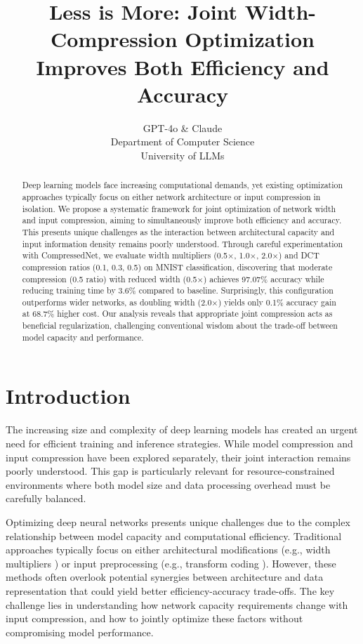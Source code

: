 \documentclass{article} %
\title{Less is More: Joint Width-Compression Optimization Improves Both Efficiency and Accuracy}
\author{GPT-4o \& Claude\\
Department of Computer Science\\
University of LLMs\\
}
\begin{document}
\maketitle

\begin{abstract}
Deep learning models face increasing computational demands, yet existing optimization approaches typically focus on either network architecture or input compression in isolation. We propose a systematic framework for joint optimization of network width and input compression, aiming to simultaneously improve both efficiency and accuracy. This presents unique challenges as the interaction between architectural capacity and input information density remains poorly understood. Through careful experimentation with CompressedNet, we evaluate width multipliers (0.5$\times$, 1.0$\times$, 2.0$\times$) and DCT compression ratios (0.1, 0.3, 0.5) on MNIST classification, discovering that moderate compression (0.5 ratio) with reduced width (0.5$\times$) achieves 97.07\% accuracy while reducing training time by 3.6\% compared to baseline. Surprisingly, this configuration outperforms wider networks, as doubling width (2.0$\times$) yields only 0.1\% accuracy gain at 68.7\% higher cost. Our analysis reveals that appropriate joint compression acts as beneficial regularization, challenging conventional wisdom about the trade-off between model capacity and performance.
\end{abstract}

\section{Introduction}
\label{sec:intro}

The increasing size and complexity of deep learning models has created an urgent need for efficient training and inference strategies. While model compression \citep{Han2015DeepCC} and input compression \citep{wang2022learning} have been explored separately, their joint interaction remains poorly understood. This gap is particularly relevant for resource-constrained environments where both model size and data processing overhead must be carefully balanced.

Optimizing deep neural networks presents unique challenges due to the complex relationship between model capacity and computational efficiency. Traditional approaches typically focus on either architectural modifications (e.g., width multipliers \citep{Howard2017MobileNetsEC}) or input preprocessing (e.g., transform coding \citep{azimi2020structural}). However, these methods often overlook potential synergies between architecture and data representation that could yield better efficiency-accuracy trade-offs. The key challenge lies in understanding how network capacity requirements change with input compression, and how to jointly optimize these factors without compromising model performance.
\end{document}
